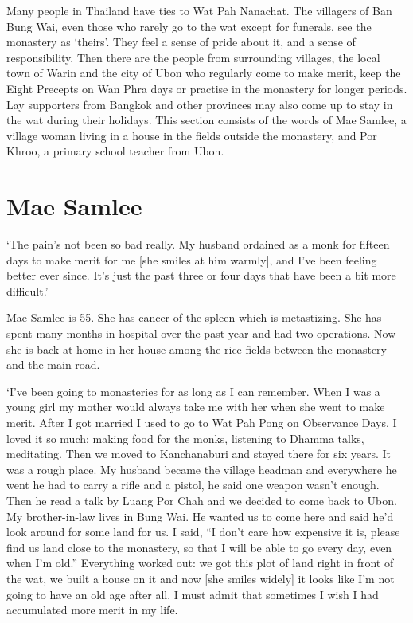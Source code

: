 
Many people in Thailand have ties to Wat Pah Nanachat. The
villagers of Ban Bung Wai, even those who rarely go to the wat except
for funerals, see the monastery as `theirs'. They feel a sense of pride
about it, and a sense of responsibility. Then there are the people from
surrounding villages, the local town of Warin and the city of Ubon who
regularly come to make merit, keep the Eight Precepts on Wan Phra days
or practise in the monastery for longer periods. Lay supporters from
Bangkok and other provinces may also come up to stay in the wat during
their holidays. This section consists of the words of Mae Samlee, a
village woman living in a house in the fields outside the monastery, and
Por Khroo, a primary school teacher from Ubon.

\section{Mae Samlee}

`The pain's not been so bad really. My husband ordained as a monk for
fifteen days to make merit for me [she smiles at him warmly], and
I've been feeling better ever since. It's just the past three or four
days that have been a bit more difficult.'

Mae Samlee is 55. She has cancer of the spleen which is metastizing. She
has spent many months in hospital over the past year and had two
operations. Now she is back at home in her house among the rice fields
between the monastery and the main road. 

`I've been going to monasteries for as long as I can remember. When I
was a young girl my mother would always take me with her when she went
to make merit. After I got married I used to go to Wat Pah Pong on
Observance Days. I loved it so much: making food for the monks, 
listening to Dhamma talks, meditating. Then we moved to Kanchanaburi and
stayed there for six years. It was a rough place. My husband became the
village headman and everywhere he went he had to carry a rifle and a
pistol, he said one weapon wasn't enough. Then he read a talk by Luang
Por Chah and we decided to come back to Ubon. My brother-in-law lives in
Bung Wai. He wanted us to come here and said he'd look around for some
land for us. I said, ``I don't care how expensive it is, please find us
land close to the monastery, so that I will be able to go every day, 
even when I'm old.'' Everything worked out: we got this plot of land
right in front of the wat, we built a house on it and now [she smiles
widely] it looks like I'm not going to have an old age after all. I
must admit that sometimes I wish I had accumulated more merit in my
life. 

